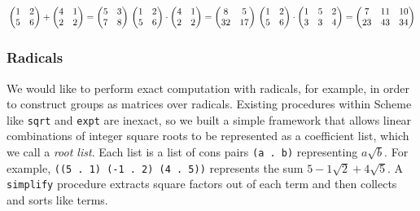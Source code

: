 \documentclass{article}
\begin{document}
\begin{minipage}[t]{0.4\textwidth}
$\\ \\ \\ \\ \\ 
\begin{pmatrix}
1&2\\ 5&6
\end{pmatrix} + 
\begin{pmatrix}
4&1\\ 2&2
\end{pmatrix} = 
\begin{pmatrix}
5&3\\ 7&8
\end{pmatrix} \\ \\ \\ \\ \\ \\ 
\begin{pmatrix}
1&2\\ 5&6
\end{pmatrix} \cdot 
\begin{pmatrix}
4&1\\ 2&2
\end{pmatrix} = 
\begin{pmatrix}
8&5\\ 32&17
\end{pmatrix} \\ \\ \\
\begin{pmatrix}
1&2\\ 5&6
\end{pmatrix} \cdot
\begin{pmatrix}
1&5&2\\ 3&3&4
\end{pmatrix} = 
\begin{pmatrix}
7&11&10\\ 23&43&34
\end{pmatrix}$
 
\end{minipage}
            
            \subsubsection{Radicals}
            \label{rootlists}
            
            	We would like to perform exact computation with radicals, for example, in order to construct groups as matrices over radicals. Existing procedures within Scheme like \texttt{sqrt} and \texttt{expt} are inexact, so we built a simple framework that allows linear combinations of integer square roots to be represented as a coefficient list, which we call a \emph{root list}. Each list is a list of cons pairs \texttt{(a . b)} representing $a \sqrt{b}$. For example, \texttt{((5 . 1) (-1 . 2) (4 . 5))} represents the sum $5 - 1\sqrt{2} + 4\sqrt{5}$. A \texttt{simplify} procedure extracts square factors out of each term and then collects and sorts like terms.
	
\end{document}
